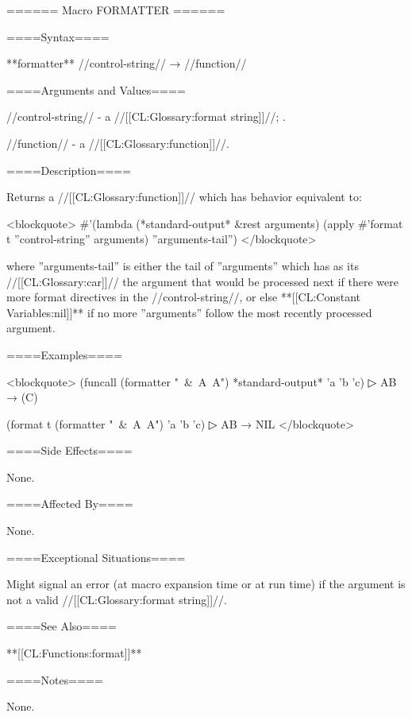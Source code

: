 ====== Macro FORMATTER ======

====Syntax====

**formatter** //control-string// → //function//

====Arguments and Values====

//control-string// - a //[[CL:Glossary:format string]]//; \noeval.

//function// - a //[[CL:Glossary:function]]//.

====Description====

Returns a //[[CL:Glossary:function]]// which has behavior equivalent to:

<blockquote> #'(lambda (*standard-output* &rest arguments) (apply #'format t ''control-string'' arguments) ''arguments-tail'') </blockquote>

where ''arguments-tail'' is either the tail of ''arguments'' which has as its //[[CL:Glossary:car]]// the argument that would be processed next if there were more format directives in the //control-string//, or else **[[CL:Constant Variables:nil]]** if no more ''arguments'' follow the most recently processed argument.

====Examples====

<blockquote> (funcall (formatter "~&~A~A") *standard-output* 'a 'b 'c)
▷ AB → (C)

(format t (formatter "~&~A~A") 'a 'b 'c)
▷ AB → NIL </blockquote>

====Side Effects====

None.

====Affected By====

None.

====Exceptional Situations====

Might signal an error (at macro expansion time or at run time) if the argument is not a valid //[[CL:Glossary:format string]]//.

====See Also====

**[[CL:Functions:format]]**

====Notes====

None.

